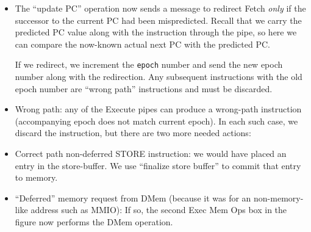 \begin{itemize}

 \item The ``update PC'' operation now sends a message to redirect
       Fetch \emph{only} if the successor to the current PC had been
       mispredicted.  Recall that we carry the predicted PC value
       along with the instruction through the pipe, so here we can
       compare the now-known actual next PC with the predicted PC.

       If we redirect, we increment the \verb|epoch| number and send
       the new epoch number along with the redirection.  Any
       subsequent instructions with the old epoch number are ``wrong
       path'' instructions and must be discarded.

 \item Wrong path: any of the Execute pipes can produce a wrong-path
       instruction (accompanying epoch does not match current epoch).
       In each such case, we discard the instruction, but there are two more needed actions:


 \item Correct path non-deferred STORE instruction: we would have
        placed an entry in the store-buffer.  We use ``finalize store
        buffer'' to commit that entry to memory.

 \item ``Deferred'' memory request from DMem (because it was for an
       non-memory-like address such as MMIO): If so, the second Exec
       Mem Ops box in the figure now performs the DMem operation.

\end{itemize}

